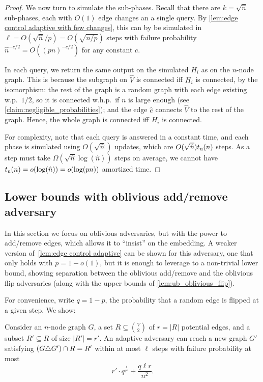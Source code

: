 \documentclass[letter,11pt]{article}
\newcommand{\tu}{t_{\textnormal{u}}}
\begin{document}
\begin{proof}
	We now turn to simulate the sub-phases.
	Recall that there are $k=\sqrt{\hat n}$ sub-phases,
	each with $O(1)$ edge changes an a single query.
	By \cref{lem:edge control adaptive with few changes},
	this can by be simulated in $\ell=O(\sqrt{\hat n}/p)=O(\sqrt{n/p})$ steps
	with failure probability $\hat n^{-c/2}=O((pn)^{-c/2})$ for any constant $c$.
	
	In each query, we return the same output on the simulated $H_i$ as on the $n$-node graph.
	This is because 
	the subgraph on $\hat V$ is connected iff $H_i$ is connected, by the isomorphism:
	the rest of the graph is a random graph with each edge existing w.p.~$1/2$, so it is connected w.h.p.\ if $n$ is large enough (see \cref{claim:negligible_probabilities});
	and the edge $\hat e$ connects 
	$\hat V$ to the rest of the graph.
	Hence, the whole graph is connected iff $H_i$ is connected.

	For complexity, 
	note that 
	each query is answered in a constant time, 
	and each phase is simulated using 
	$O(\sqrt{\hat n})$ updates, which are
	$O(\sqrt{\hat n})\tu(n)$ steps.
	As a step must take $\Omega(\sqrt{\hat n}\log(\hat n))$
	steps on average,
	we cannot have $\tu(n)=o(\log(\hat n))=o(\log(pn))$ amortized time.
\end{proof}

\subsection{Lower bounds with oblivious add/remove adversary}
In this section we focus on oblivious adversaries, but with the power to add/remove edges, which allows it to ``insist'' on the embedding. 
A weaker version of~\cref{lem:edge control adaptive} can be shown for this adversary, one that only holds with $p = 1 - o(1)$, but it is enough to leverage to a non-trivial lower bound, showing separation between the oblivious add/remove and the oblivious flip adversaries (along with the upper bounds of \cref{lem:ub_oblivious_flip}).

For convenience, write $q = 1 - p$, the probability that a random edge is flipped at a given step. We show:  

\begin{lemma}
	\label{lem:edge control oblivious}
	Consider an $n$-node graph $G$, a set $R\subseteq \binom{V}{2}$ of $r=|R|$ potential edges,
	and a subset $R'\subseteq R$ of size $|R'|= r'$.
	An adaptive adversary can reach a new graph $G'$ satisfying 
	$(G\triangle G')\cap R = R'$
	within at most 
    $\ell$ steps with failure probability at most
    \[
        r' \cdot q^{\frac{\ell}{r'}} + \frac{q\ell r}{n^2}.
    \]
\end{lemma}
\end{document}
